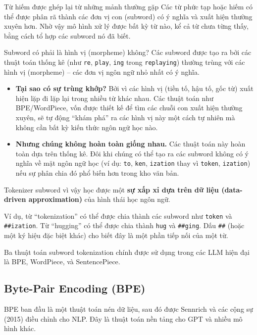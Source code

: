 \begin{keyidea}{Từ hiếm được ghép lại từ những mảnh thường gặp}
Các từ phức tạp hoặc hiếm có thể được phân rã thành các đơn vị con (subword) có ý nghĩa và xuất hiện thường xuyên hơn. Nhờ vậy mô hình xử lý được bất kỳ từ nào, kể cả từ chưa từng thấy, bằng cách tổ hợp các subword nó đã biết.
\end{keyidea}
\begin{deepdive}{Subword có phải là hình vị (morpheme) không?}
Các subword được tạo ra bởi các thuật toán thống kê (như \texttt{re}, \texttt{play}, \texttt{ing} trong \texttt{replaying}) thường trùng với các hình vị (morpheme) -- các đơn vị ngôn ngữ nhỏ nhất có ý nghĩa.
\begin{itemize}
    \item \textbf{Tại sao có sự trùng khớp?} Bởi vì các hình vị (tiền tố, hậu tố, gốc từ) xuất hiện lặp đi lặp lại trong nhiều từ khác nhau. Các thuật toán như BPE/WordPiece, vốn được thiết kế để tìm các chuỗi con xuất hiện thường xuyên, sẽ tự động “khám phá” ra các hình vị này một cách tự nhiên mà không cần bất kỳ kiến thức ngôn ngữ học nào.
    \item \textbf{Nhưng chúng không hoàn toàn giống nhau.} Các thuật toán này hoàn toàn dựa trên thống kê. Đôi khi chúng có thể tạo ra các subword không có ý nghĩa về mặt ngôn ngữ học (ví dụ: \texttt{to}, \texttt{ken}, \texttt{ization} thay vì \texttt{token}, \texttt{ization}) nếu sự phân chia đó phổ biến hơn trong kho văn bản.
\end{itemize}
Tokenizer subword vì vậy học được một \textbf{sự xấp xỉ dựa trên dữ liệu (data-driven approximation)} của hình thái học ngôn ngữ.
\end{deepdive}
Ví dụ, từ ``tokenization'' có thể được chia thành các subword như \texttt{token} và \texttt{\#\#ization}. 
Từ ``hugging'' có thể được chia thành \texttt{hug} và \texttt{\#\#ging}. 
Dấu \texttt{\#\#} (hoặc một ký hiệu đặc biệt khác) cho biết đây là một phần tiếp nối của một từ.

Ba thuật toán subword tokenization chính được sử dụng trong các LLM hiện đại là BPE, WordPiece, và SentencePiece.

\subsection{Byte-Pair Encoding (BPE)}
\label{ssec:bpe}

BPE ban đầu là một thuật toán nén dữ liệu, sau đó được Sennrich và các cộng sự (2015) \cite{sennrich2015neural} điều chỉnh cho NLP. Đây là thuật toán nền tảng cho GPT và nhiều mô hình khác.

